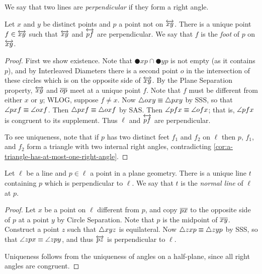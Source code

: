 We say that two lines are \emph{perpendicular} if they form a right angle.

\begin{construct}\label{construct:foot}
Let \(x\) and \(y\) be distinct points and \(p\) a point not on \(\overleftrightarrow{xy}\).
There is a unique point \(f \in \overleftrightarrow{xy}\) such that \(\overleftrightarrow{xy}\) and \(\overleftrightarrow{pf}\) are perpendicular.
We say that \(f\) is the \emph{foot} of \(p\) on \(\overleftrightarrow{xy}\).
\end{construct}

\begin{proof}
First we show existence.
Note that \(\CIRCLE{x}{p} \cap \CIRCLE{y}{p}\) is not empty (as it contains \(p\)), and by Interleaved Diameters there is a second point \(o\) in the intersection of these circles which is on the opposite side of \(\overleftrightarrow{xy}\).
By the Plane Separation property, \(\overleftrightarrow{xy}\) and \(\overline{op}\) meet at a unique point \(f\).
Note that \(f\) must be different from either \(x\) or \(y\); WLOG, suppose \(f \neq x\).
Now \(\bigtriangleup{oxy} \equiv \bigtriangleup{pxy}\) by SSS, so that \(\angle{pxf} \equiv \angle{oxf}\).
Then \(\bigtriangleup{pxf} \equiv \bigtriangleup{oxf}\) by SAS.
Then \(\angle{pfx} \equiv \angle{ofx}\); that is, \(\angle{pfx}\) is congruent to its supplement.
Thus \(\ell\) and \(\overleftrightarrow{pf}\) are perpendicular.

To see uniqueness, note that if \(p\) has two distinct feet \(f_1\) and \(f_2\) on \(\ell\) then \(p\), \(f_1\), and \(f_2\) form a triangle with two internal right angles, contradicting \ref{cor:a-triangle-has-at-most-one-right-angle}.
\end{proof}

\begin{construct}
Let \(\ell\) be a line and \(p \in \ell\) a point in a plane geometry.
There is a unique line \(t\) containing \(p\) which is perpendicular to \(\ell\).
We say that \(t\) is the \emph{normal line} of \(\ell\) at \(p\).
\end{construct}

\begin{proof}
Let \(x\) be a point on \(\ell\) different from \(p\), and copy \(\overline{px}\) to the opposite side of \(p\) at a point \(y\) by Circle Separation.
Note that \(p\) is the midpoint of \(\overline{xy}\).
Construct a point \(z\) such that \(\bigtriangleup{xyz}\) is equilateral.
Now \(\bigtriangleup{zxp} \equiv \bigtriangleup{zyp}\) by SSS, so that \(\angle{zpx} \equiv \angle{zpy}\), and thus \(\overleftrightarrow{pz}\) is perpendicular to \(\ell\).

Uniqueness follows from the uniqueness of angles on a half-plane, since all right angles are congruent.
\end{proof}

